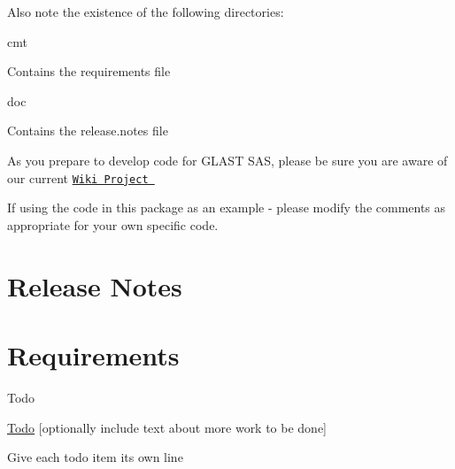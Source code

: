 Also note the existence of the following directories\-:
\begin{DoxyItemize}
\item cmt
\end{DoxyItemize}
\begin{DoxyEnumerate}
\item Contains the requirements file
\end{DoxyEnumerate}
\begin{DoxyItemize}
\item doc
\end{DoxyItemize}
\begin{DoxyEnumerate}
\item Contains the release.\-notes file
\end{DoxyEnumerate}

As you prepare to develop code for G\-L\-A\-S\-T S\-A\-S, please be sure you are aware of our current \href{http://code.google.com/p/scoialrobot/}{\tt Wiki Project }

If using the code in this package as an example -\/ please modify the comments as appropriate for your own specific code.



 \hypertarget{index_notes}{}\section{Release Notes}\label{index_notes}


 \hypertarget{index_requirements}{}\section{Requirements}\label{index_requirements}

\begin{DoxyVerbInclude}
\end{DoxyVerbInclude}
 

 \begin{DoxyRefDesc}{Todo}
\item[\hyperlink{todo__todo000001}{Todo}]\mbox{[}optionally include text about more work to be done\mbox{]} 

Give each todo item its own line\end{DoxyRefDesc}
